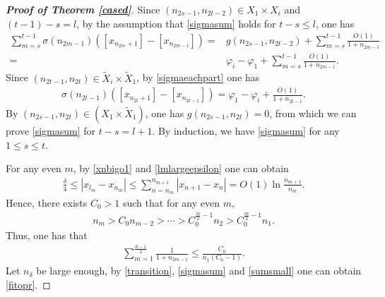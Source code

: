 \documentclass[12pt]{amsart}
\newcommand{\abs}[1]{\left\lvert #1 \right\rvert}
\theoremstyle{plain}
\theoremstyle{definition}
\begin{document}
\begin{proof}[\textbf{Proof of Theorem \ref{cased}}]
Since $(n_{2s-1},n_{2t-2})\in X_1\times {X}_i$ and $(t-1)-s=l$, by the assumption that \eqref{sigmasum} holds for $t-s\leq l$, one has
\begin{align}
{\sum_{m=s}^{t-1}\sigma(n_{2m-1})(\left[x_{n_{2m}+1}\right]-\left[x_{n_{2m-1}}\right])}=&g(n_{2s-1},n_{2t-2})+ \sum_{m=s}^{t-1}\frac{O(1)}{1+n_{2m-1}}\nonumber\\
=&\varphi_i-\varphi_1+\sum_{m=s}^{t-1}\frac{O(1)}{1+n_{2m-1}}.\nonumber
\end{align}
Since $(n_{2t-1},n_{2t})\in \tilde{X}_i\times \tilde{X}_1$, by \eqref{sigmaeachpart} one has
\begin{align}
{\sigma(n_{2t-1})(\left[x_{n_{2t}+1}\right]-\left[x_{n_{2t-1}}\right])}=\varphi_1-\varphi_i+\frac{O(1)}{1+n_{2t-1}}.\nonumber
\end{align}
By $(n_{2s-1},n_{2t})\in (X_1\times \tilde{X}_1)$, one has $g(n_{2s-1},n_{2t})=0$, from which we can prove \eqref{sigmasum} for $t-s=l+1$. By induction, we have \eqref{sigmasum} for any $1\leq s\leq t$.



	
	
	For any even $m$, by \eqref{xnbigo1} and \eqref{lmlargeepsilon} one can obtain
\begin{align}
\frac{\delta}{4}\leq \abs{x_{l_m}-x_{n_m}}\leq \sum_{n=n_{m}}^{n_{m+1}}\abs{x_{n+1}-x_n}= O(1)\ln \frac{n_{m+1}}{n_m}.\nonumber
\end{align}
Hence, there exists $C_0>1$ such that for any even $m$,
\begin{align}
n_m>C_0n_{m-2}>\cdots>C_0^{\frac{m}{2}-1}n_2>C_0^{\frac{m}{2}-1}n_1.\nonumber
\end{align}
Thus, one has that 
\begin{align}
\sum_{m=1}^{\frac{d-1}{2}}\frac{1}{1+n_{2m-1}}\leq \frac{C_0}{n_1(C_0-1)}.\label{sumsmall}
\end{align}
Let $n_\delta$ be large enough, by \eqref{transition}, \eqref{sigmasum} and \eqref{sumsmall} one can obtain \eqref{fitopr}.
\end{proof}
\end{document}
